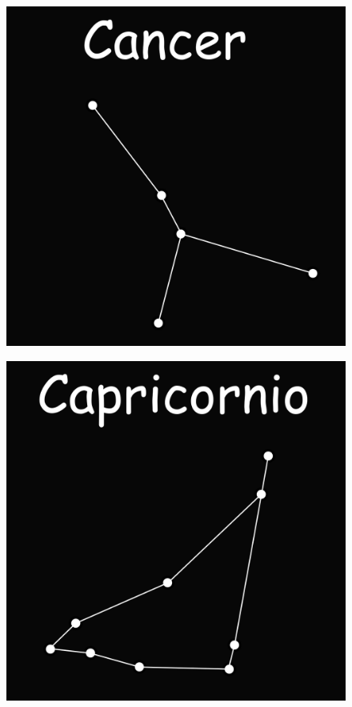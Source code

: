 \documentclass{beamer}
\begin{document}
\begin{frame}
 \begin{figure}
   \centering
   \includegraphics[scale=0.2]{Imagenes/Cancer_01}
  \end{figure}
\end{frame}

\begin{frame}
 \begin{figure}
   \centering
   \includegraphics[scale=0.2]{Imagenes/Capricornio_01}
  \end{figure}
\end{frame}
  
\end{document}
